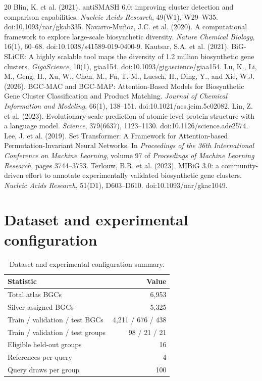 \documentclass{article}
\begin{document}

\begin{thebibliography}{20}
 Blin, K. et al. (2021). antiSMASH 6.0: improving cluster detection and comparison capabilities. \textit{Nucleic Acids Research}, 49(W1), W29--W35. doi:10.1093/nar/gkab335.
 Navarro-Mu\~{n}oz, J.C. et al. (2020). A computational framework to explore large-scale biosynthetic diversity. \textit{Nature Chemical Biology}, 16(1), 60--68. doi:10.1038/s41589-019-0400-9.
 Kautsar, S.A. et al. (2021). BiG-SLiCE: A highly scalable tool maps the diversity of 1.2 million biosynthetic gene clusters. \textit{GigaScience}, 10(1), giaa154. doi:10.1093/gigascience/giaa154.
 Lu, K., Li, M., Geng, H., Xu, W., Chen, M., Fu, T.-M., Luesch, H., Ding, Y., and Xie, W.J. (2026). BGC-MAC and BGC-MAP: Attention-Based Models for Biosynthetic Gene Cluster Classification and Product Matching. \textit{Journal of Chemical Information and Modeling}, 66(1), 138--151. doi:10.1021/acs.jcim.5c02082.
 Lin, Z. et al. (2023). Evolutionary-scale prediction of atomic-level protein structure with a language model. \textit{Science}, 379(6637), 1123--1130. doi:10.1126/science.ade2574.
 Lee, J. et al. (2019). Set Transformer: A Framework for Attention-based Permutation-Invariant Neural Networks. In \textit{Proceedings of the 36th International Conference on Machine Learning}, volume 97 of \textit{Proceedings of Machine Learning Research}, pages 3744--3753.
 Terlouw, B.R. et al. (2023). MIBiG 3.0: a community-driven effort to annotate experimentally validated biosynthetic gene clusters. \textit{Nucleic Acids Research}, 51(D1), D603--D610. doi:10.1093/nar/gkac1049.
\end{thebibliography}

\appendix
\section{Dataset and experimental configuration}
\begin{table}[H]
\caption{Dataset and experimental configuration summary.}
\centering
\small
\begin{tabular}{lr}
\toprule
Statistic & Value \\
\midrule
Total atlas BGCs & 6,953 \\
Silver assigned BGCs & 5,325 \\
Train / validation / test BGCs & 4,211 / 676 / 438 \\
Train / validation / test groups & 98 / 21 / 21 \\
Eligible held-out groups & 16 \\
References per query & 4 \\
Query draws per group & 100 \\
\bottomrule
\end{tabular}
\end{table}
\end{document}
